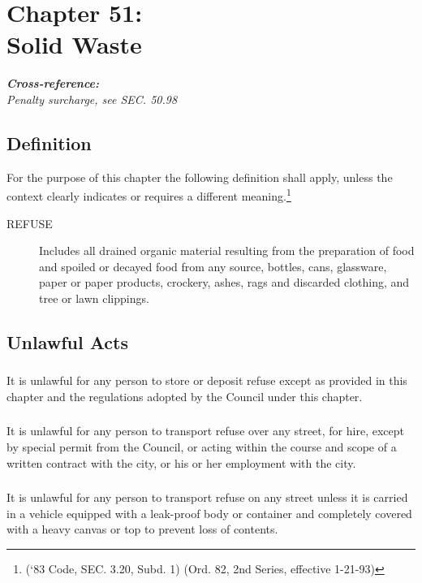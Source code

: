 \chapter*{Chapter 51: \\
	Solid Waste}
    \minitoc
    \textbf{\emph{{Cross-reference:}}}\\
    \emph{Penalty surcharge, see SEC. 50.98}
    \pagebreak

\section{Definition}
For the purpose of this chapter the following definition shall apply, unless the context clearly indicates or requires a different meaning.\footnote{(‘83 Code, SEC. 3.20, Subd. 1) (Ord. 82, 2nd Series, effective 1-21-93)}
\begin{description}
    \item[REFUSE] Includes all drained organic material resulting from the preparation of food and spoiled or decayed food from any source, bottles, cans, glassware, paper or paper products, crockery, ashes, rags and discarded clothing, and tree or lawn clippings.
\end{description}
\section{Unlawful Acts}
\subsection{}
It is unlawful for any person to store or deposit refuse except as provided in this chapter and the regulations adopted by the Council under this chapter.
\subsection{}
It is unlawful for any person to transport refuse over any street, for hire, except by special permit from the Council, or acting within the course and scope of a written contract with the city, or his or her employment with the city.
\subsection{}
It is unlawful for any person to transport refuse on any street unless it is carried in a vehicle equipped with a leak-proof body or container and completely covered with a heavy canvas or top to prevent loss of contents.
